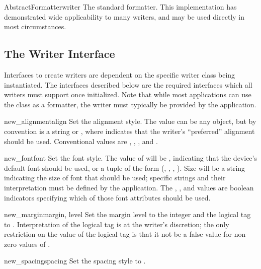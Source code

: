 \begin{funcdesc}{AbstractFormatter}{writer}
The standard formatter.  This implementation has demonstrated wide
applicability to many writers, and may be used directly in most
circumstances.
\end{funcdesc}



\subsection{The Writer Interface}

Interfaces to create writers are dependent on the specific writer
class being instantiated.  The interfaces described below are the
required interfaces which all writers must support once initialized.
Note that while most applications can use the 
class as a formatter, the writer must typically be provided by the
application.

\begin{funcdesc}{new_alignment}{align}
Set the alignment style.  The  value can be any object,
but by convention is a string or , where 
indicates that the writer's ``preferred'' alignment should be used.
Conventional  values are , ,
, and .
\end{funcdesc}

\begin{funcdesc}{new_font}{font}
Set the font style.  The value of  will be ,
indicating that the device's default font should be used, or a tuple
of the form (, , , ).
Size will be a string indicating the size of font that should be used;
specific strings and their interpretation must be defined by the
application.  The , , and  values
are boolean indicators specifying which of those font attributes
should be used.
\end{funcdesc}

\begin{funcdesc}{new_margin}{margin, level}
Set the margin level to the integer  and the logical tag
to .  Interpretation of the logical tag is at the
writer's discretion; the only restriction on the value of the logical
tag is that it not be a false value for non-zero values of
.
\end{funcdesc}

\begin{funcdesc}{new_spacing}{spacing}
Set the spacing style to .
\end{funcdesc}

